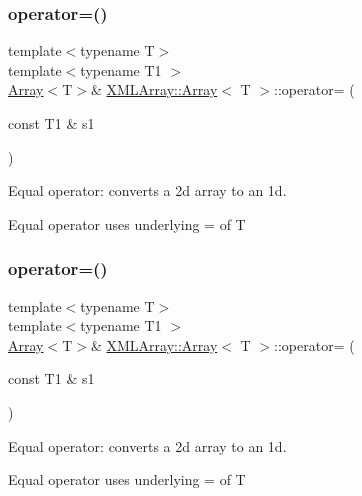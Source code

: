 \subsubsection{\texorpdfstring{operator=()}{operator=()}\hspace{0.1cm}{\footnotesize\ttfamily [3/6]}}
{\footnotesize\ttfamily template$<$typename T$>$ \\
template$<$typename T1 $>$ \\
\mbox{\hyperlink{classXMLArray_1_1Array}{Array}}$<$T$>$\& \mbox{\hyperlink{classXMLArray_1_1Array}{X\+M\+L\+Array\+::\+Array}}$<$ T $>$\+::operator= (\begin{DoxyParamCaption}\item[{const T1 \&}]{s1 }\end{DoxyParamCaption})\hspace{0.3cm}{\ttfamily [inline]}}



Equal operator\+: converts a 2d array to an 1d. 

Equal operator uses underlying = of T \mbox{\label{classXMLArray_1_1Array_a3051ecb95c6d07f9ad80e72a2fd50c61}} 
\subsubsection{\texorpdfstring{operator=()}{operator=()}\hspace{0.1cm}{\footnotesize\ttfamily [4/6]}}
{\footnotesize\ttfamily template$<$typename T$>$ \\
template$<$typename T1 $>$ \\
\mbox{\hyperlink{classXMLArray_1_1Array}{Array}}$<$T$>$\& \mbox{\hyperlink{classXMLArray_1_1Array}{X\+M\+L\+Array\+::\+Array}}$<$ T $>$\+::operator= (\begin{DoxyParamCaption}\item[{const T1 \&}]{s1 }\end{DoxyParamCaption})\hspace{0.3cm}{\ttfamily [inline]}}



Equal operator\+: converts a 2d array to an 1d. 

Equal operator uses underlying = of T \mbox{\label{classXMLArray_1_1Array_a73e85fb91d2c802400fa356bc3ce77e1}} 
